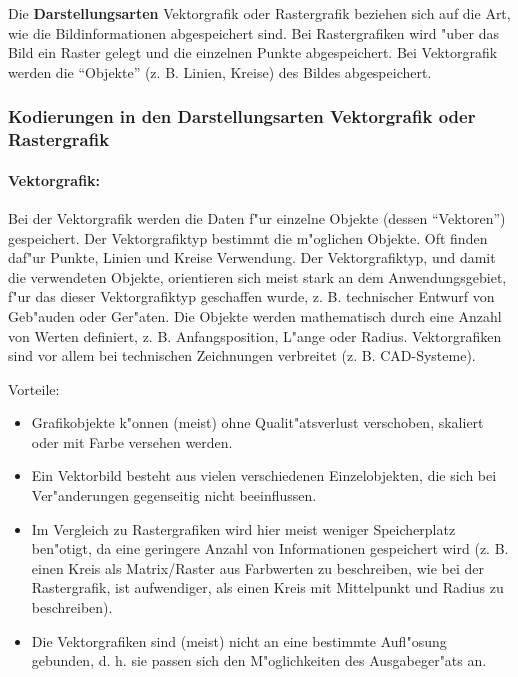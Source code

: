 \bigskip\noindent
Die \textbf{Darstellungsarten} Vektorgrafik oder Rastergrafik beziehen sich auf die Art, wie die Bildinformationen abgespeichert sind. Bei Rastergrafiken wird "uber das Bild ein Raster gelegt und die einzelnen Punkte abgespeichert. Bei Vektorgrafik werden die ``Objekte'' (z. B. Linien, Kreise) des Bildes abgespeichert.


\subsubsection{Kodierungen in den Darstellungsarten Vektorgrafik oder Rastergrafik}

\paragraph{Vektorgrafik:}

Bei der Vektorgrafik werden die Daten f"ur einzelne Objekte (dessen ``Vektoren'') gespeichert. Der Vektorgrafiktyp bestimmt die m"oglichen Objekte. Oft finden daf"ur Punkte, Linien und Kreise Verwendung. Der Vektorgrafiktyp, und damit die verwendeten Objekte, orientieren sich meist stark an dem Anwendungsgebiet, f"ur das dieser Vektorgrafiktyp geschaffen wurde, z. B. technischer Entwurf von Geb"auden oder Ger"aten. Die Objekte werden mathematisch durch eine Anzahl von Werten definiert, z. B. Anfangsposition, L"ange oder Radius. Vektorgrafiken sind vor allem bei technischen Zeichnungen verbreitet (z. B. CAD-Systeme).

\bigskip\noindent
Vorteile:
\begin{itemize}
  \item Grafikobjekte k"onnen (meist) ohne Qualit"atsverlust verschoben, skaliert oder mit Farbe versehen werden.
  \item Ein Vektorbild besteht aus vielen verschiedenen Einzelobjekten, die sich bei Ver"anderungen gegenseitig nicht beeinflussen.
  \item Im Vergleich zu Rastergrafiken wird hier meist weniger Speicherplatz ben"otigt, da eine geringere Anzahl von Informationen gespeichert wird (z. B. einen Kreis als Matrix/Raster aus Farbwerten zu beschreiben, wie bei der Rastergrafik, ist aufwendiger, als einen Kreis mit Mittelpunkt und Radius zu beschreiben).
  \item Die Vektorgrafiken sind (meist) nicht an eine bestimmte Aufl"osung gebunden, d. h. sie passen sich den M"oglichkeiten des Ausgabeger"ats an.
\end{itemize}


